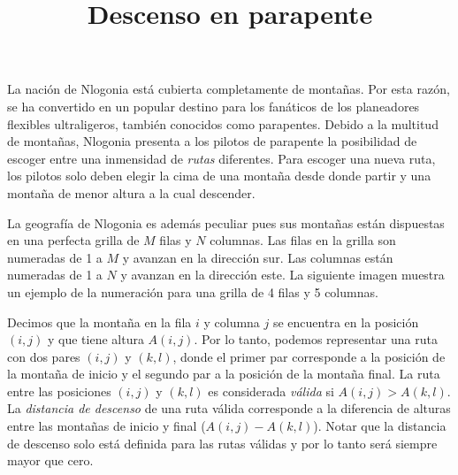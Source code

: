 \documentclass{oci}
\title{Descenso en parapente}
\begin{document}
\begin{problemDescription}

La nación de Nlogonia está cubierta completamente de montañas.
Por esta razón, se ha convertido en un popular destino para los fanáticos de los planeadores
flexibles ultraligeros, también conocidos como parapentes.
Debido a la multitud de montañas, Nlogonia presenta a los pilotos de parapente la posibilidad de
escoger entre una inmensidad de \emph{rutas} diferentes.
Para escoger una nueva ruta, los pilotos solo deben elegir la cima de una montaña desde donde
partir y una montaña de menor altura a la cual descender.

La geografía de Nlogonia es además peculiar pues sus montañas están dispuestas en una perfecta
grilla de $M$ filas y $N$ columnas.
Las filas en la grilla son numeradas de 1 a $M$ y avanzan en la dirección sur.
Las columnas están numeradas de 1 a $N$ y avanzan en la dirección este.
La siguiente imagen muestra un ejemplo de la numeración para una grilla de 4 filas y 5 columnas.
\begin{center}
\end{center}

Decimos que la montaña en la fila $i$ y columna $j$ se encuentra en la posición $(i,j)$ y que
tiene altura $A(i,j)$.
Por lo tanto, podemos representar una ruta con dos pares $(i, j)$ y $(k,l)$, donde el primer par
corresponde a la posición de la montaña de inicio y el segundo par a la posición de la montaña
final.
La ruta entre las posiciones $(i, j)$ y $(k, l)$ es considerada \emph{válida} si $A(i, j) > A(k, l)$.
La \emph{distancia de descenso} de una ruta válida corresponde a la diferencia de alturas entre
las montañas de inicio y final ($A(i, j) - A(k, l)$).
Notar que la distancia de descenso solo está definida para las rutas válidas y por lo tanto será
siempre mayor que cero.


\end{problemDescription}
\end{document}
